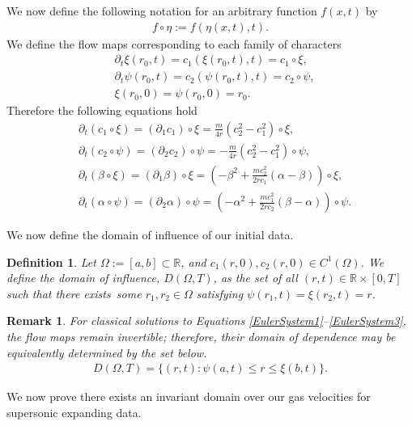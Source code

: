 \documentclass[11pt]{article}
\newtheorem{definition}{Definition}[section]
\newtheorem{remark}{Remark}[section]
\begin{document}
We now define the following notation for an arbitrary function $f(x,t)$ by
\begin{align}
	f\circ\eta := f(\eta(x,t),t).
\end{align} 
We define the flow maps corresponding to each family of characters 
\begin{align}
	&\partial_t\xi(r_0,t) = c_1(\xi(r_0,t),t) = c_1\circ\xi,
	\\
	&\partial_t\psi(r_0,t) = c_2(\psi(r_0,t),t) = c_2\circ\psi,
	\\
	&\xi(r_0,0) = \psi(r_0,0) = r_0.
\end{align} 
Therefore the following equations hold 
\begin{align}
	&\partial_t(c_1\circ\xi) = (\partial_1c_1)\circ\xi = \frac{m}{4r}(c_2^2-c_1^2) \circ\xi, 
	\\
	&\partial_t(c_2\circ\psi) = (\partial_2c_2)\circ\psi = - \frac{m}{4r}(c_2^2-c_1^2) \circ\psi, 
	\\
	&\partial_t(\beta\circ\xi) = (\partial_1\beta)\circ\xi =  \left(-\beta^2 + \frac{mc_2^2}{2rc_1}(\alpha-\beta)\right)\circ\xi, \label{Eqn:beta_evolve}
	\\
	&\partial_t(\alpha\circ\psi) = (\partial_2\alpha)\circ\psi = \left(-\alpha^2 + \frac{mc_1^2}{2rc_2}(\beta-\alpha) \right)\circ\psi. \label{Eqn:alpha_evolve} 
\end{align} 

We now define the domain of influence of our initial data.  
\begin{definition}
Let $\Omega := [a,b] \subset \mathbb{R}$, and $c_1(r,0), c_2(r,0) \in C^1(\Omega)$. We define the domain of influence, $D(\Omega,T)$, as the set of all $(r,t) \in \mathbb{R} \times [0,T]$ such that there exists\ some $r_1,r_2\in\Omega$ satisfying $\psi(r_1,t)=\xi(r_2,t)=r$. 
\end{definition} 

\begin{remark}
	For classical solutions to Equations \ref{EulerSystem1}--\ref{EulerSystem3}, the flow maps remain invertible; therefore, their domain of dependence may be equivalently determined by the set below. 
	\begin{align}
		D(\Omega,T) = \{(r,t) : \psi(a,t) \leq r \leq \xi(b, t) \}.
	\end{align}
\end{remark}

We now prove there exists an invariant domain over our gas velocities for supersonic expanding data. 
\end{document}
